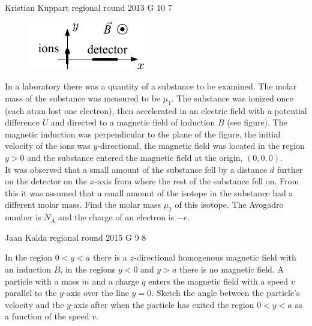 \documentclass[11pt]{article}
\begin{document}
{Kristian Kuppart} %
{regional round} %
{2013} %
{G 10} %
{7} %
{

\ifEngStatement
\begin{figure}%
\includegraphics[width=\linewidth]{2013-v2g-10-massspektromeeter_ipe_ing}%
\end{figure}
In a laboratory there was a quantity of a substance to be examined. The molar mass of the substance was measured to be $\mu_{1}$. The substance was ionized once (each atom lost one electron), then accelerated in an electric field with a potential difference $U$ and directed to a magnetic field of induction $B$ (see figure). The magnetic induction was perpendicular to the plane of the figure, the initial velocity of the ions was $y$-directional, the magnetic field was located in the region $y>0$ and the substance entered the magnetic field at the origin, $(0, 0, 0)$.\\
It was observed that a small amount of the substance fell by a distance $d$ further on the detector on the $x$-axis from where the rest of the substance fell on. From this it was assumed that a small amount of the isotope in the substance had a different molar mass. Find the molar mass $\mu_{2}$ of this isotope. The Avogadro number is $N_A$ and the charge of an electron is $-e$.
\fi
}

{Jaan Kalda} %
{regional round} %
{2015} %
{G 9} %
{8} %
{

\ifEngStatement
In the region $0<y<a$ there is a $z$-directional homogenous magnetic field with an induction $B$, in the regions $y<0$ and $y>a$ there is no magnetic field. A particle with a mass $m$ and a charge $q$ enters the magnetic field with a speed $v$ parallel to the $y$-axis over the line $y=0$. Sketch the angle between the particle’s velocity and the $y$-axis after when the particle has exited the region $0<y<a$ as a function of the speed $v$.
\fi
}
\end{document}
